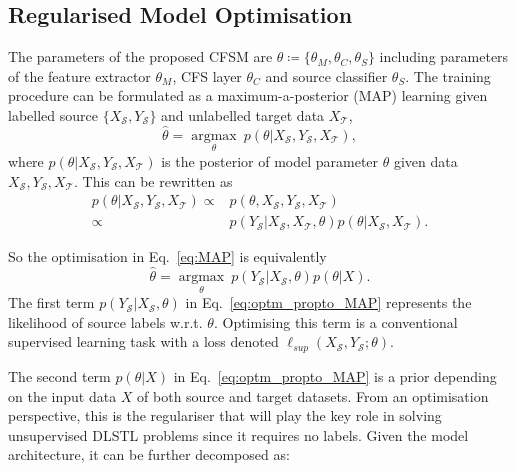 \documentclass[letterpaper]{article} \usepackage{aaai19}  \usepackage{times}  \usepackage{helvet}  \usepackage{courier}  \usepackage{url}  \usepackage{graphicx}
\begin{document}
\subsection{Regularised Model Optimisation}
The parameters of the proposed CFSM are $\theta \coloneqq \{\theta_{M}, \theta_{C}, \theta_{S}\}$ including parameters of the feature extractor $\theta_M$, CFS layer $\theta_C$ and source classifier $\theta_{S}$. The training procedure can be formulated as a maximum-a-posterior (MAP) learning given labelled source $\{X_\mathcal{S}, Y_\mathcal{S}\}$ and unlabelled target data $X_\mathcal{T}$,
\begin{equation}\label{eq:MAP}
	\hat{\theta} = \underset{\theta}{\operatorname{argmax}}~ p(\theta | X_\mathcal{S}, Y_\mathcal{S}, X_\mathcal{T}),
\end{equation}
where $p(\theta | X_\mathcal{S}, Y_\mathcal{S}, X_\mathcal{T})$ is the posterior of model parameter $\theta$ given data $X_\mathcal{S}, Y_\mathcal{S}, X_\mathcal{T}$.
This can be rewritten as
\begin{equation}\label{eq:propto_MAP}
\begin{split}
	p(\theta | X_\mathcal{S}, Y_\mathcal{S}, X_\mathcal{T})\propto & p(\theta, X_\mathcal{S}, Y_\mathcal{S}, X_\mathcal{T}) \\
	\propto &p(Y_\mathcal{S} | X_\mathcal{S}, X_\mathcal{T}, \theta) p(\theta | X_\mathcal{S}, X_\mathcal{T}). \end{split}
\end{equation}


So the optimisation in Eq.~\ref{eq:MAP} is equivalently
\begin{equation}\label{eq:optm_propto_MAP}
	\hat{\theta} = \underset{\theta}{\operatorname{argmax}}~ p(Y_\mathcal{S} | X_\mathcal{S}, \theta) p(\theta | X).
\end{equation}
The first term $p(Y_\mathcal{S} | X_\mathcal{S}, \theta)$ in Eq.~\ref{eq:optm_propto_MAP} represents the likelihood of source labels w.r.t. $\theta$. Optimising this term is a conventional supervised learning task with a loss denoted $\ell_{sup}(X_\mathcal{S}, Y_\mathcal{S}; \theta)$. 

The second term $p(\theta | X)$ in Eq.~\ref{eq:optm_propto_MAP} is a prior depending on the input data $X$ of both source and target datasets. From an optimisation perspective, this is the regulariser that will play the key role in solving unsupervised DLSTL problems since it requires no labels. Given the model architecture, it can be further decomposed as:
\end{document}

